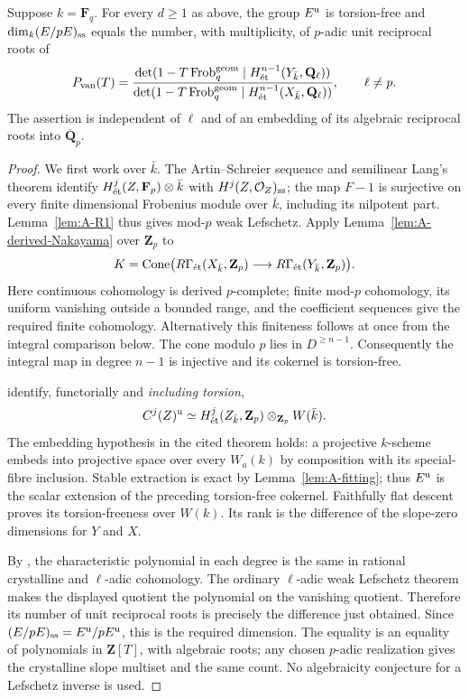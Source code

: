 \begin{theorem}\label{thm:A-unit-count}
 Suppose $k=\mathbf F_q$.  For every $d\geq1$ as above,
the group $E^{\rm u}$ is torsion-free and
$\dim_k(E/pE)_{\ss}$ equals the number, with multiplicity, of
$p$-adic unit reciprocal roots of
\[
 P_{\rm van}(T)=
 \frac{\det(1-T\operatorname{Frob}_q^{\rm geom}\mid
 H^{n-1}_{\et}(Y_{\bar k},\mathbf Q_\ell))}
 {\det(1-T\operatorname{Frob}_q^{\rm geom}\mid
 H^{n-1}_{\et}(X_{\bar k},\mathbf Q_\ell))},\qquad\ell\ne p.
\]
The assertion is independent of $\ell$ and of an embedding of its
algebraic reciprocal roots into $\overline{\mathbf Q}_p$.
\end{theorem}
\begin{proof}
We first work over $\bar k$.  The Artin--Schreier sequence and
semilinear Lang's theorem identify
$H^j_{\et}(Z,\mathbf F_p)\otimes\bar k$ with
$H^j(Z,\OO_Z)_{\ss}$; the map $F-1$ is surjective on every finite
dimensional Frobenius module over $\bar k$, including its nilpotent
part.  Lemma~\ref{lem:A-R1} thus gives mod-$p$ weak Lefschetz.
Apply Lemma~\ref{lem:A-derived-Nakayama} over $\mathbf Z_p$ to
\[
K=\operatorname{Cone}\bigl(R\Gamma_{\et}(X_{\bar k},\Zp)
 \longrightarrow R\Gamma_{\et}(Y_{\bar k},\Zp)\bigr).
\]
Here continuous cohomology is derived $p$-complete; finite mod-$p$
cohomology, its uniform vanishing outside a bounded range, and the
coefficient sequences give the required finite cohomology.  Alternatively
this finiteness follows at once from the integral comparison below.
The cone modulo $p$ lies in $D^{\geq n-1}$.  Consequently the integral
map in degree $n-1$ is injective and its cokernel is torsion-free.

\citet[Theorem 4.9, Remark 4.10 and Corollary 4.11]{Ogus1975}
identify, functorially and \emph{including torsion},
\[
 C^j(Z)^{\rm u}\simeq
 H^j_{\et}(Z_{\bar k},\Zp)\otimes_{\Zp}W(\bar k).
\]
The embedding hypothesis in the cited theorem holds: a projective
$k$-scheme embeds into projective space over every $W_a(k)$ by
composition with its special-fibre inclusion.  Stable extraction is
exact by Lemma~\ref{lem:A-fitting}; thus $E^{\rm u}$ is the scalar
extension of the preceding torsion-free cokernel.  Faithfully flat
descent proves its torsion-freeness over $W(k)$.  Its rank is the
difference of the slope-zero dimensions for $Y$ and $X$.

By \citet[Theorem 1, p.~74]{KatzMessing1974}, the characteristic
polynomial in each degree is the same in rational crystalline and
$\ell$-adic cohomology.  The ordinary $\ell$-adic weak Lefschetz theorem
makes the displayed quotient the polynomial on the vanishing quotient.
Therefore its number of unit reciprocal roots is precisely the
difference just obtained.  Since $(E/pE)_{\ss}=E^{\rm u}/pE^{\rm u}$,
this is the required dimension.  The equality is an equality of
polynomials in $\mathbf Z[T]$, with algebraic roots; any chosen
$p$-adic realization gives the crystalline slope multiset and the
same count.  No algebraicity conjecture for a Lefschetz inverse is used.


\end{proof}
